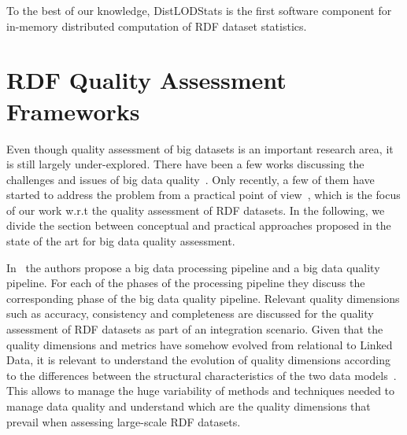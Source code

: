 To the best of our knowledge, DistLODStats is the first software component for in-memory distributed computation of \gls{RDF} dataset statistics. 

\section{RDF Quality Assessment Frameworks}
Even though quality assessment of big datasets is an important research area, it is still largely under-explored. 
There have been a few works discussing the challenges and issues of big data quality~\cite{becker2015big,RaoG015,cai2015challenges}. 
Only recently, a few of them have started to address the problem from a practical point of view~\cite{debattista2016luzzu}, which is the focus of our work w.r.t the quality assessment of \gls{RDF} datasets.
In the following, we divide the section between conceptual and practical approaches proposed in the state of the art for big data quality assessment.

In~\cite{CatarciSCD17} the authors propose a big data processing pipeline and a big data quality pipeline. 
For each of the phases of the processing pipeline they discuss the corresponding phase of the big data quality pipeline.
Relevant quality dimensions such as accuracy, consistency and completeness are discussed for the quality assessment of \gls{RDF} datasets as part of an integration scenario.
Given that the quality dimensions and metrics have somehow evolved from relational to Linked Data,
it is relevant to understand the evolution of quality dimensions according to the differences between the structural characteristics of the two data models~\cite{BatiniRSV15}. 
This allows to manage the huge variability of methods and techniques needed to manage data quality and understand which are the quality dimensions that prevail when assessing large-scale \gls{RDF} datasets.

